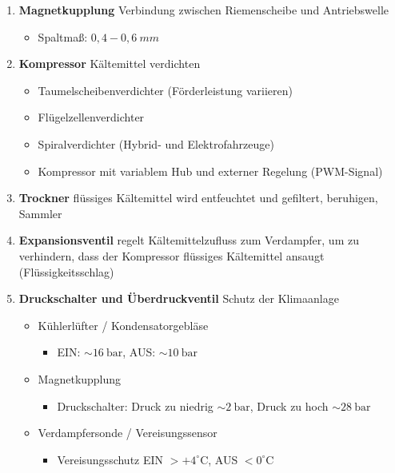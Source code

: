 \begin{enumerate}
\item
  \textbf{Magnetkupplung} Verbindung zwischen Riemenscheibe und
  Antriebswelle

  \begin{itemize}
  \item
    Spaltmaß: $0,4 - 0,6~mm$
  \end{itemize}
\item
  \textbf{Kompressor} Kältemittel verdichten

  \begin{itemize}
  \item
    Taumelscheibenverdichter (Förderleistung variieren)
  \item
    Flügelzellenverdichter
  \item
    Spiralverdichter (Hybrid- und Elektrofahrzeuge)
  \item
    Kompressor mit variablem Hub und externer Regelung (PWM-Signal)
  \end{itemize}
\item
  \textbf{Trockner} flüssiges Kältemittel wird entfeuchtet und
  gefiltert, beruhigen, Sammler
\item
  \textbf{Expansionsventil} regelt Kältemittelzufluss zum Verdampfer, um
  zu verhindern, dass der Kompressor flüssiges Kältemittel ansaugt
  (Flüssigkeitsschlag)
\item
  \textbf{Druckschalter und Überdruckventil} Schutz der Klimaanlage

  \begin{itemize}
  \item
    Kühlerlüfter / Kondensatorgebläse

    \begin{itemize}
    \item
      EIN: $\sim 16~\text{bar}$, AUS: $\sim 10~\text{bar}$
    \end{itemize}
  \item
    Magnetkupplung

    \begin{itemize}
    \item
      Druckschalter: Druck zu niedrig $\sim 2~\text{bar}$, Druck zu
      hoch $\sim 28~\text{bar}$
    \end{itemize}
  \item
    Verdampfersonde / Vereisungssensor

    \begin{itemize}
    \item
      Vereisungsschutz EIN $> +4^\circ \text{C}$, AUS
      $< 0^\circ \text{C}$
    \end{itemize}
  \end{itemize}
\end{enumerate}

